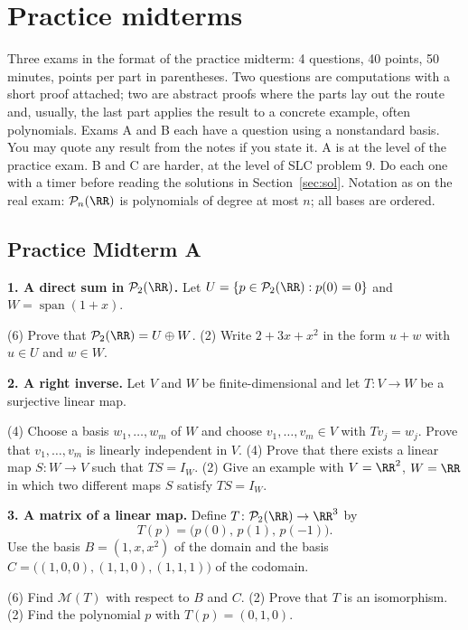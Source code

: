 \documentclass[11pt]{scrartcl}
\DeclareMathOperator{\spn}{span}
\newcommand{\PP}{\mathcal P}
\newcommand{\MM}{\mathcal M}
\begin{document}
\section{Practice midterms}

Three exams in the format of the practice midterm: 4 questions, 40 points, 50 minutes, points per part in parentheses. Two questions are computations with a short proof attached; two are abstract proofs where the parts lay out the route and, usually, the last part applies the result to a concrete example, often polynomials. Exams A and B each have a question using a nonstandard basis. You may quote any result from the notes if you state it.
A is at the level of the practice exam. B and C are harder, at the level of SLC problem 9. Do each one with a timer before reading the solutions in Section~\ref{sec:sol}.
Notation as on the real exam: $\PP_n(\RR)$ is polynomials of degree at most $n$; all bases are ordered.

\clearpage\begingroup\subsection{Practice Midterm A}

\medskip\noindent\textbf{1. A direct sum in $\PP_2(\RR)$.} Let $U=\{p\in\PP_2(\RR):p(0)=0\}$ and $W=\spn(1+x)$.
\begin{enumerate}[a)]
  \ii (6) Prove that $\PP_2(\RR)=U\oplus W$.
  \ii (2) Write $2+3x+x^2$ in the form $u+w$ with $u\in U$ and $w\in W$.
\end{enumerate}

\medskip\noindent\textbf{2. A right inverse.} Let $V$ and $W$ be finite-dimensional and let $T\colon V\to W$ be a surjective linear map.
\begin{enumerate}[a)]
  \ii (4) Choose a basis $w_1,\dots,w_m$ of $W$ and choose $v_1,\dots,v_m\in V$ with $Tv_j=w_j$. Prove that $v_1,\dots,v_m$ is linearly independent in $V$.
  \ii (4) Prove that there exists a linear map $S\colon W\to V$ such that $TS=I_W$.
  \ii (2) Give an example with $V=\RR^2$, $W=\RR$ in which two different maps $S$ satisfy $TS=I_W$.
\end{enumerate}

\medskip\noindent\textbf{3. A matrix of a linear map.} Define $T\colon\PP_2(\RR)\to\RR^3$ by
\[ T(p)=\big(p(0),\,p(1),\,p(-1)\big). \]
Use the basis $B=(1,x,x^2)$ of the domain and the basis $C=\big((1,0,0),(1,1,0),(1,1,1)\big)$ of the codomain.
\begin{enumerate}[a)]
  \ii (6) Find $\MM(T)$ with respect to $B$ and $C$.
  \ii (2) Prove that $T$ is an isomorphism.
  \ii (2) Find the polynomial $p$ with $T(p)=(0,1,0)$.
\end{enumerate}
\end{document}
